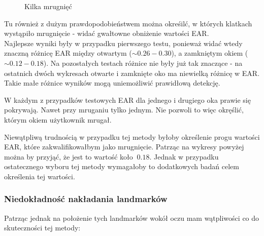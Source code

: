 \documentclass[10pt, a4paper]{article}
\begin{document}
\begin{figure}[H]
    \centering
    \caption{Kilka mrugnięć}
    \label{fig:multi_blinks_3}
\end{figure}

Tu również z dużym prawdopodobieństwem można okreśilć, w których klatkach wystąpiło mrugnięcie - widać gwałtowne obniżenie wartości EAR.
\\
Najlepsze wyniki były w przypadku pierwszego testu, ponieważ widać wtedy znaczną różnicę EAR między otwartym ($\sim0.26 - 0.30$), a zamkniętym okiem ($\sim0.12-0.18$). Na pozostałych testach różnice nie były już tak znaczące - na ostatnich dwóch wykresach otwarte i zamknięte oko ma niewielką różnicę w EAR. Takie małe różnice wyników mogą uniemożliwić prawidłową detekcję.

\vspace{3mm}
W każdym z przypadków testowych EAR dla jednego i drugiego oka prawie się pokrywają. Nawet przy mruganiu tylko jednym. Nie pozwoli to więc okręślić, którym okiem użytkownik mrugał.

\vspace{3mm}

Niewątpliwą trudnością w przypadku tej metody byłoby określenie progu wartości EAR, które zakwalifikowałbym jako mrugnięcie. Patrząc na wykresy powyżej można by przyjąć, że jest to wartość koło $~0.18$. Jednak w przypadku ostatecznego wyboru tej metody wymagałoby to dodatkowych badań celem określenia tej wartości.


\subsubsection{Niedokładność nakładania landmarków}

Patrząc jednak na położenie tych landmarków wokół oczu mam wątpliwości co do skuteczności tej metody:
\end{document}
